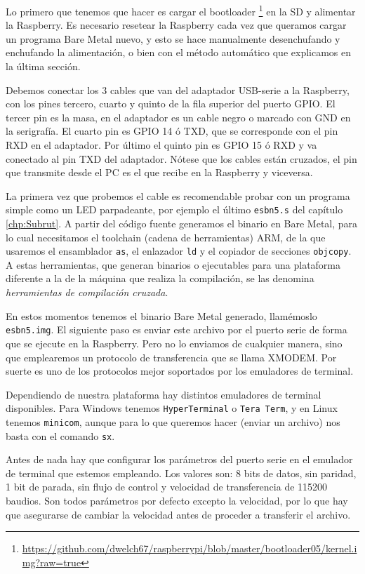 Lo primero que tenemos que hacer es cargar el bootloader
\footnote{\url{https://github.com/dwelch67/raspberrypi/blob/master/bootloader05/kernel.img?raw=true}}
en la SD y alimentar la Raspberry. Es necesario resetear la Raspberry cada vez que
queramos cargar un programa Bare Metal nuevo, y esto se hace manualmente desenchufando y
enchufando la alimentación, o bien con el método automático que explicamos en la última sección.

Debemos conectar los 3 cables que van del adaptador USB-serie a la Raspberry, con los pines
tercero, cuarto y quinto de la fila superior del puerto GPIO. El tercer pin es la masa, en el
adaptador es un cable negro o marcado con GND en la serigrafía. El cuarto pin es GPIO 14 ó TXD,
que se corresponde con el pin RXD en el adaptador. Por último el quinto pin es GPIO 15 ó RXD y
va conectado al pin TXD del adaptador. Nótese que los cables están cruzados, el pin que
transmite desde el PC es el que recibe en la Raspberry y viceversa.

La primera vez que probemos el cable es recomendable probar con un programa simple como un
LED parpadeante, por ejemplo el último {\tt esbn5.s} del capítulo \ref{chp:Subrut}. A partir
del código fuente generamos el binario en Bare Metal, para lo cual necesitamos el toolchain
(cadena de herramientas) ARM, de la que usaremos el ensamblador {\tt as}, el enlazador {\tt ld}
y el copiador de secciones {\tt objcopy}. A estas herramientas, que generan binarios
o ejecutables para una plataforma diferente a la de la máquina que realiza la compilación,
se las denomina {\it herramientas de compilación cruzada}.

En estos momentos tenemos el binario Bare Metal generado, llamémoslo {\tt esbn5.img}. El
siguiente paso es enviar este archivo por el puerto serie de forma que se ejecute en la
Raspberry. Pero no lo enviamos de cualquier manera, sino que emplearemos un protocolo
de transferencia que se llama XMODEM. Por suerte es uno de los protocolos mejor soportados
por los emuladores de terminal.

Dependiendo de nuestra plataforma hay distintos emuladores de terminal disponibles. Para
Windows tenemos {\tt HyperTerminal} o {\tt Tera Term}, y en Linux tenemos {\tt minicom},
aunque para lo que queremos hacer (enviar un archivo) nos basta con el comando {\tt sx}.

Antes de nada hay que configurar los parámetros del puerto serie en el emulador de
terminal que estemos empleando. Los valores son: 8 bits de datos, sin paridad, 1 bit de
parada, sin flujo de control y velocidad de transferencia de 115200 baudios. Son todos
parámetros por defecto excepto la velocidad, por lo que hay que asegurarse de cambiar
la velocidad antes de proceder a transferir el archivo.

